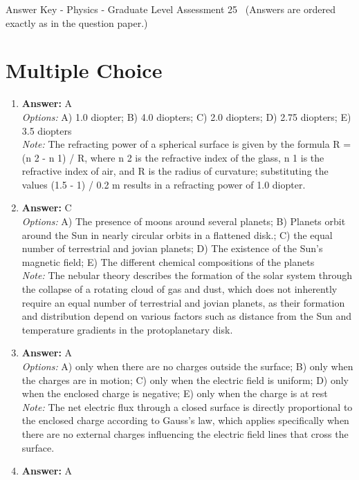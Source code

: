 \documentclass[12pt]{article}
\begin{document}
\begin{center}
Answer Key - Physics - Graduate Level Assessment 25 \
\small (Answers are ordered exactly as in the question paper.)
\end{center}

\section*{Multiple Choice}
\begin{enumerate}[label=\arabic*.]
\item \textbf{Answer:} A
\\ \textit{Options:} A) 1.0 diopter; B) 4.0 diopters; C) 2.0 diopters; D) 2.75 diopters; E) 3.5 diopters
\\ \textit{Note:} The refracting power of a spherical surface is given by the formula R = (n 2 - n 1) / R, where n 2 is the refractive index of the glass, n 1 is the refractive index of air, and R is the radius of curvature; substituting the values (1.5 - 1) / 0.2 m results in a refracting power of 1.0 diopter.
\item \textbf{Answer:} C
\\ \textit{Options:} A) The presence of moons around several planets; B) Planets orbit around the Sun in nearly circular orbits in a flattened disk.; C) the equal number of terrestrial and jovian planets; D) The existence of the Sun's magnetic field; E) The different chemical compositions of the planets
\\ \textit{Note:} The nebular theory describes the formation of the solar system through the collapse of a rotating cloud of gas and dust, which does not inherently require an equal number of terrestrial and jovian planets, as their formation and distribution depend on various factors such as distance from the Sun and temperature gradients in the protoplanetary disk.
\item \textbf{Answer:} A
\\ \textit{Options:} A) only when there are no charges outside the surface; B) only when the charges are in motion; C) only when the electric field is uniform; D) only when the enclosed charge is negative; E) only when the charge is at rest
\\ \textit{Note:} The net electric flux through a closed surface is directly proportional to the enclosed charge according to Gauss's law, which applies specifically when there are no external charges influencing the electric field lines that cross the surface.
\item \textbf{Answer:} A

\end{enumerate}
\end{document}

